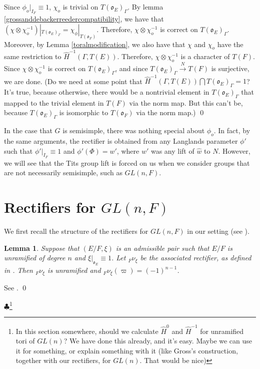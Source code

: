 \documentclass[11pt]{amsart}
\theoremstyle{plain}
\newtheorem{lemma}[theorem]{Lemma}
\newcommand{\MAxxx}[1]{$\clubsuit$\footnote{#1}}
\theoremstyle{definition}
\begin{document}
Since $\phi_o|_{I_F} \equiv 1$, $\chi_o$ is trivial on
$T(\mathfrak{o}_E)_{\Gamma}$.  By lemma
\ref{grossanddebackerreedercompatibility}, we have that
$(\chi \otimes \chi_o^{-1})|_{T(\mathfrak{o}_E)_{\Gamma}} = \chi_{\phi}|_{T(\mathfrak{o}_F)}$.
Therefore, $\chi \otimes \chi_o^{-1}$ is correct on
$T(\mathfrak{o}_E)_{\Gamma}$.  Moreover, by Lemma
\ref{toralmodification}, we also have that $\chi$ and $\chi_o$ have
the same restriction to $\hat{H}^{-1}(\Gamma, T(E))$.  Therefore,
$\chi \otimes \chi_o^{-1}$ is a character of $T(F)$.  Since
$\chi \otimes \chi_o^{-1}$ is correct on $T(\mathfrak{o}_E)_{\Gamma}$, and
since $T(\mathfrak{o}_E)_{\Gamma} \xrightarrow{N} T(F)$ is surjective,
we are done.  (Do we need at some point that
$\hat{H}^{-1}(\Gamma, T(E)) \bigcap T(\mathfrak{o}_E)_{\Gamma} = 1$?
It's true, because otherwise, there would be a nontrivial element in
$T(\mathfrak{o}_E)_{\Gamma}$ that mapped to the trivial element in
$T(F)$ via the norm map.  But this can't be, because
$T(\mathfrak{o}_E)_{\Gamma}$ is isomorphic to $T(\mathfrak{o}_F)$ via
the norm map.)
\qed

In the case that $G$ is semisimple, there was nothing special about
$\phi_o$.  In fact, by the same arguments, the rectifier is obtained
from any Langlands parameter $\phi'$ such that $\phi'|_{I_F} \equiv 1$
and $\phi'(\Phi) = w'$, where $w'$ was any lift of $\hat{w}$ to $N$.
However, we will see that the Tits group lift is forced on us when we
consider groups that are not necessarily semisimple, such as $GL(n,F)$.

\section{Rectifiers for $GL(n,F)$}\label{GL(n)}

We first recall the structure of the rectifiers for $GL(n,F)$ in our
setting (see \cite{bushnellhenniart}).

\begin{lemma}
  Suppose that $(E/F, \xi)$ is an admissible pair such that $E/F$ is
  unramified of degree $n$ and $\xi|_{\mathfrak{o}_E} \equiv 1$.  Let
  ${}_F \nu_{\xi}$ be the associated rectifier, as defined in
  \cite{bushnellhenniart}.  Then ${}_F \nu_{\xi}$ is unramified and
  ${}_F \nu_{\xi}(\varpi) = (-1)^{n-1}$.
\end{lemma}

\proof
See \cite[Proposition 21]{bushnellhenniart}.
\qed

\MAxxx{In this section somewhere, should we calculate $\hat{H}^0$ and
  $\hat{H}^{-1}$ for unramified tori of $GL(n)$? We have done this
  already, and it's easy.  Maybe we can use it for something, or
  explain something with it (like Gross's construction, together with
  our rectifiers, for $GL(n)$.  That would be nice)}
\end{document}
